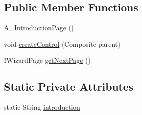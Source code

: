 \subsection*{Public Member Functions}
\begin{DoxyCompactItemize}
\item 
\hyperlink{classit_1_1isislab_1_1masonhelperdocumentation_1_1mason_1_1wizards_1_1_a___introduction_page_a0ad4b7c0d0d63d7408d41ae0ea64cc74}{A\-\_\-\-Introduction\-Page} ()
\item 
void \hyperlink{classit_1_1isislab_1_1masonhelperdocumentation_1_1mason_1_1wizards_1_1_a___introduction_page_ab2150ace9b2c3717fafb9880f1078e17}{create\-Control} (Composite parent)
\item 
I\-Wizard\-Page \hyperlink{classit_1_1isislab_1_1masonhelperdocumentation_1_1mason_1_1wizards_1_1_a___introduction_page_a2cf283c12319487dc35d2bb428327133}{get\-Next\-Page} ()
\end{DoxyCompactItemize}
\subsection*{Static Private Attributes}
\begin{DoxyCompactItemize}
\item 
static String \hyperlink{classit_1_1isislab_1_1masonhelperdocumentation_1_1mason_1_1wizards_1_1_a___introduction_page_a48f9e6bddf3bb2d7ba3995b09dd4da0b}{introduction}
\end{DoxyCompactItemize}


